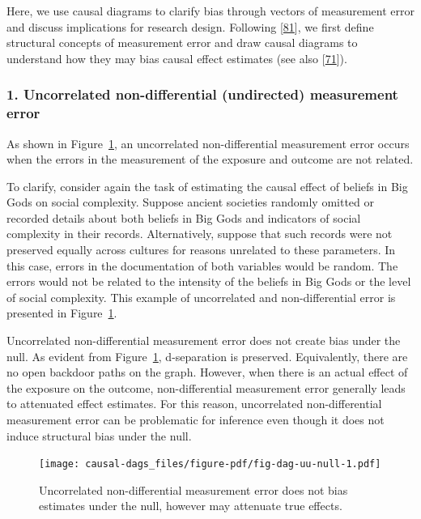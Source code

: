 \documentclass[
  singlecolumn]{article}
\begin{document}
Here, we use causal diagrams to clarify bias through vectors of
measurement error and discuss implications for research design.
Following {[}\protect\hyperlink{ref-hernuxe1n2009}{81}{]}, we first
define structural concepts of measurement error and draw causal diagrams
to understand how they may bias causal effect estimates (see also
{[}\protect\hyperlink{ref-vanderweele2012}{71}{]}).

\hypertarget{uncorrelated-non-differential-undirected-measurement-error}{%
\subsubsection{1. Uncorrelated non-differential (undirected) measurement
error}\label{uncorrelated-non-differential-undirected-measurement-error}}

As shown in Figure~\ref{fig-dag-uu-null}, an uncorrelated
non-differential measurement error occurs when the errors in the
measurement of the exposure and outcome are not related.

To clarify, consider again the task of estimating the causal effect of
beliefs in Big Gods on social complexity. Suppose ancient societies
randomly omitted or recorded details about both beliefs in Big Gods and
indicators of social complexity in their records. Alternatively, suppose
that such records were not preserved equally across cultures for reasons
unrelated to these parameters. In this case, errors in the documentation
of both variables would be random. The errors would not be related to
the intensity of the beliefs in Big Gods or the level of social
complexity. This example of uncorrelated and non-differential error is
presented in Figure~\ref{fig-dag-uu-null}.

Uncorrelated non-differential measurement error does not create bias
under the null. As evident from Figure~\ref{fig-dag-uu-null},
d-separation is preserved. Equivalently, there are no open backdoor
paths on the graph. However, when there is an actual effect of the
exposure on the outcome, non-differential measurement error generally
leads to attenuated effect estimates. For this reason, uncorrelated
non-differential measurement error can be problematic for inference even
though it does not induce structural bias under the null.

\begin{figure}

{\centering \texttt{[image: causal-dags\_files/figure-pdf/fig-dag-uu-null-1.pdf]}

}

\caption{\label{fig-dag-uu-null}Uncorrelated non-differential
measurement error does not bias estimates under the null, however may
attenuate true effects.}

\end{figure}
\end{document}
